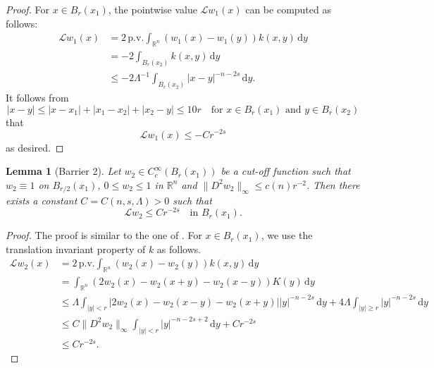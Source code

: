 \documentclass[11pt]{amsart}
\theoremstyle{plain}
\newtheorem{lemma}[theorem]{Lemma}
\theoremstyle{definition}
\numberwithin{equation}{section}
\begin{document}
\begin{proof}
    For $x \in B_r(x_1)$, the pointwise value $\mathcal{L}w_1(x)$ can be computed as follows:
    \begin{equation*}
        \begin{aligned}
            \mathcal{L}w_1(x)&=2\,\mathrm{p.v.}\int_{\mathbb{R}^n} (w_1(x)-w_1(y))k(x, y)\,\mathrm{d}y\\
            &=-2\int_{B_r(x_2)} k(x, y)\,\mathrm{d}y\\
            &\leq -2\Lambda^{-1}\int_{B_r(x_2)} |x-y|^{-n-2s}\,\mathrm{d}y.
        \end{aligned}
    \end{equation*}
    It follows from 
    \begin{equation*}
        |x-y| \leq |x-x_1|+|x_1-x_2|+|x_2-y| \leq 10r \quad \text{for $x \in B_r(x_1)$ and $y \in B_r(x_2)$}
    \end{equation*}
    that
    \begin{equation*}
        \mathcal{L}w_1(x) \leq -Cr^{-2s}
    \end{equation*}
    as desired.
\end{proof}

\begin{lemma}[Barrier 2]\label{lem-barrier2}
   Let $w_2 \in C_c^{\infty}(B_{r}(x_1))$ be a cut-off function such that $w_2 \equiv 1$ on $B_{r/2}(x_1)$, $0 \leq w_2 \leq 1$ in $\mathbb{R}^n$ and $\|D^2w_2\|_{\infty} \leq c(n)r^{-2}$.  Then there exists a constant $C=C(n, s, \Lambda)>0$ such that
    \begin{equation*}
        \mathcal{L}w_2 \leq Cr^{-2s} \quad \text{in $B_{r}(x_1)$}.
    \end{equation*}
\end{lemma}

\begin{proof}
    The proof is similar to the one of . For $x \in B_r(x_1)$, we use the translation invariant property of $k$ as follows.
    \begin{equation*}
        \begin{aligned}
            \mathcal{L}w_2(x)&=2\,\mathrm{p.v.}\int_{\mathbb{R}^n} (w_2(x)-w_2(y))k(x,y)\,\mathrm{d}y\\
            &=\int_{\mathbb{R}^n} (2w_2(x)-w_2(x+y)-w_2(x-y))K(y) \,\mathrm{d}y\\
            &\leq \Lambda\int_{|y|<r} |2w_2(x)-w_2(x-y)-w_2(x+y)||y|^{-n-2s}  \,\mathrm{d}y+4\Lambda\int_{|y| \geq r} |y|^{-n-2s}  \,\mathrm{d}y\\
            &\leq C \|D^2w_2\|_{\infty} \int_{|y|<r} |y|^{-n-2s+2}  \,\mathrm{d}y+Cr^{-2s}\\
            &\leq Cr^{-2s}. 
        \end{aligned}
    \end{equation*}
\end{proof}
\end{document}
